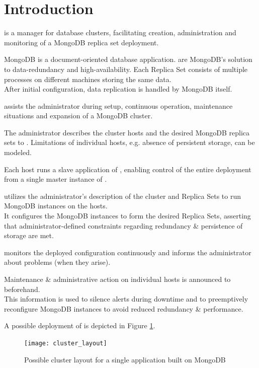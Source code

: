 \documentclass[a4paper, 11pt]{article}
\let\oldsection\section
\renewcommand\section{\clearpage\oldsection}
\begin{document}
\section{Introduction}
\mamid is a manager for database \glspl{cluster}, facilitating creation, administration and monitoring of a \gls{MongoDB} \gls{replica set} deployment.

\gls{MongoDB} is a document-oriented database application.  are MongoDB's solution to data-redundancy and high-availability. Each Replica Set consists of multiple processes on different machines storing the same data.\\
After initial configuration, data replication is handled by MongoDB itself.

\mamid assists the \gls{administrator} during setup, continuous operation, maintenance situations and expansion of a \gls{MongoDB} cluster.

The \gls{administrator} describes the cluster \glspl{host} and the desired \gls{MongoDB} \glspl{replica set} to \mamid.
Limitations of individual hosts, e.g. absence of persistent storage, can be modeled.

Each \gls{host} runs a \gls{slave} application of \mamid, enabling control of the entire deployment from a single \gls{master} instance of \mamid.

\mamid utilizes the \gls{administrator}'s description of the cluster and Replica Sets to run \gls{MongoDB} instances on the \glspl{host}.\\
It configures the \gls{MongoDB} instances to form the desired Replica Sets, asserting that administrator-defined constraints regarding redundancy \& persistence of storage are met.

\mamid monitors the deployed configuration continuously and informs the \gls{administrator} about problems (when they arise).

Maintenance \& administrative action on individual hosts is announced to \mamid beforehand.\\
This information is used to silence alerts during downtime and to preemptively reconfigure MongoDB instances to avoid reduced redundancy \& performance.

A possible deployment of \mamid is depicted in Figure \ref{fig:cluster_layout}.

\begin{figure}[H]
	\centering
	\texttt{[image: cluster\_layout]} %
	\caption{Possible cluster layout for a single application built on MongoDB}
	\label{fig:cluster_layout}
\end{figure}
\end{document}
